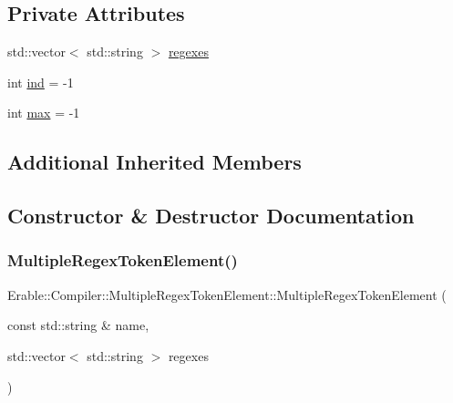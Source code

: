 \subsection*{Private Attributes}
\begin{DoxyCompactItemize}
\item 
std\+::vector$<$ std\+::string $>$ \mbox{\hyperlink{class_erable_1_1_compiler_1_1_multiple_regex_token_element_afa320f00032296ec3da6651b879146cb}{regexes}}
\item 
int \mbox{\hyperlink{class_erable_1_1_compiler_1_1_multiple_regex_token_element_ae33d6b69215d8e1e22fb78eab9323483}{ind}} = -\/1
\item 
int \mbox{\hyperlink{class_erable_1_1_compiler_1_1_multiple_regex_token_element_ad23e05f97e52b4e2a7a3d3aefd5b36e3}{max}} = -\/1
\end{DoxyCompactItemize}
\subsection*{Additional Inherited Members}


\subsection{Constructor \& Destructor Documentation}
\mbox{\label{class_erable_1_1_compiler_1_1_multiple_regex_token_element_aa2dba4d51a11bd4d278e2614a921d1fc}} 
\subsubsection{\texorpdfstring{MultipleRegexTokenElement()}{MultipleRegexTokenElement()}}
{\footnotesize\ttfamily Erable\+::\+Compiler\+::\+Multiple\+Regex\+Token\+Element\+::\+Multiple\+Regex\+Token\+Element (\begin{DoxyParamCaption}\item[{const std\+::string \&}]{name,  }\item[{std\+::vector$<$ std\+::string $>$}]{regexes }\end{DoxyParamCaption})}



